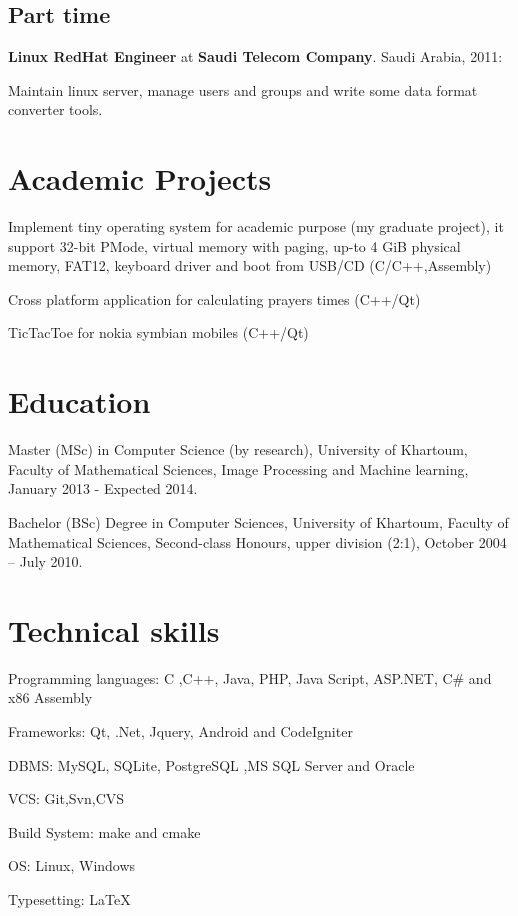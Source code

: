 \documentclass[letterpaper]{article}
\renewenvironment{itemize}{
  \begin{list}{}{
    \setlength{\leftmargin}{1.5em}
  }
}{
  \end{list}
}
\begin{document}
\subsection*{Part time}
\begin{itemize}

\item \textbf{Linux RedHat Engineer} at \textbf{Saudi Telecom Company}. Saudi Arabia, 2011:
\begin{itemize}
\item Maintain linux server, manage users and groups and write some data format converter tools.
\end{itemize}

\end{itemize}

\section*{Academic Projects}
\begin{itemize}
\item Implement tiny operating system for academic purpose (my graduate project), it support 32-bit PMode, virtual memory with paging, up-to 4 GiB physical memory, FAT12, keyboard driver and boot from USB/CD (C/C++,Assembly)
\item Cross platform application for calculating prayers times (C++/Qt)
\item TicTacToe for nokia symbian mobiles (C++/Qt)
\end{itemize}

\section*{Education}
\begin{itemize}
\item Master (MSc) in Computer Science (by research), University of Khartoum, Faculty of Mathematical Sciences, Image Processing and Machine learning, January 2013 - Expected 2014.
\item Bachelor (BSc) Degree in Computer Sciences, University of Khartoum, Faculty of Mathematical Sciences, Second-class Honours, upper division (2:1), October 2004 -- July 2010.
\end{itemize}

\section*{Technical skills}
\begin{itemize}
\item Programming languages: {\small C ,C++, Java, PHP, Java Script, ASP.NET, C\# and x86 Assembly}
\item Frameworks: {\small Qt, .Net, Jquery, Android and CodeIgniter}
\item DBMS: {\small MySQL, SQLite, PostgreSQL ,MS SQL Server and Oracle}
\item VCS: {\small Git,Svn,CVS}
\item Build System: {\small make and cmake}
\item OS: {\small Linux, Windows}
\item Typesetting: {\small \LaTeX{}}
\end{itemize}
\end{document}
